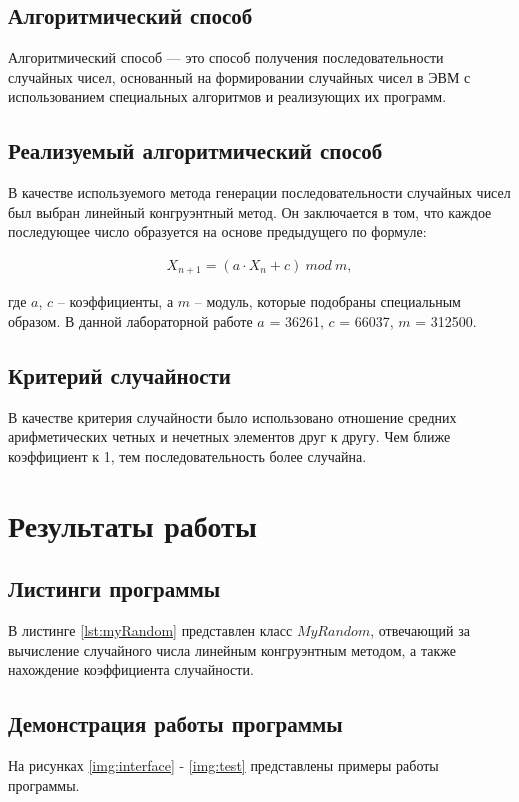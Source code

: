 \documentclass{bmstu}
\begin{document}
\section{Алгоритмический способ}

Алгоритмический способ --- это способ получения последовательности случайных чисел, основанный на формировании случайных чисел в ЭВМ с использованием специальных алгоритмов и реализующих их программ.

\section{Реализуемый алгоритмический способ}

В качестве используемого метода генерации последовательности случайных чисел был выбран линейный конгруэнтный метод.
Он заключается в том, что каждое последующее число образуется на основе предыдущего по формуле:

\begin{equation}
    \begin{aligned}
        X_{n + 1} = (a \cdot X_{n } + c) \ mod \ m,
    \end{aligned}
\end{equation}

где $a$, $c$ -- коэффициенты, а $m$ -- модуль, которые подобраны специальным образом. В данной лабораторной работе $a$ = 36261, $c$ = 66037, $m$ = 312500.

\section{Критерий случайности}

В качестве критерия случайности было использовано отношение средних арифметических четных и нечетных элементов друг к другу.
Чем ближе коэффициент к 1, тем последовательность более случайна.


\chapter{Результаты работы}

\section{Листинги программы}

В листинге \ref{lst:myRandom} представлен класс $MyRandom$, отвечающий за вычисление случайного числа линейным конгруэнтным методом, а также нахождение коэффициента случайности.



\clearpage

\section{Демонстрация работы программы}

На рисунках \ref{img:interface} - \ref{img:test} представлены примеры работы программы.


\end{document}
